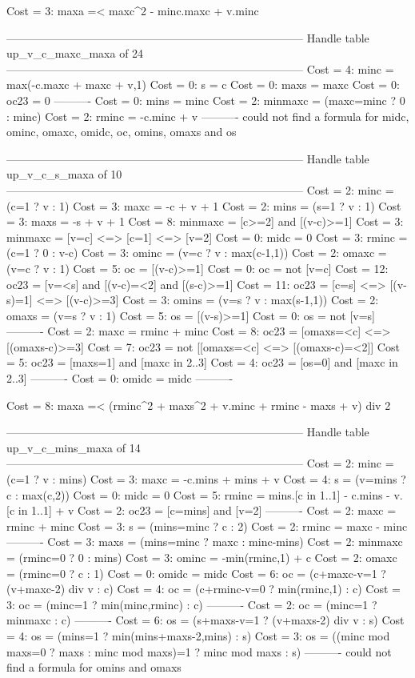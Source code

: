 Cost =  3:  maxa =< maxc^2 - minc.maxc + v.minc

--------------------------------------------------------------------------------
Handle table up_v_c_maxc_maxa of 24
--------------------------------------------------------------------------------
Cost =  4:  minc    = max(-c.maxc + maxc + v,1)
Cost =  0:  s       = c
Cost =  0:  maxs    = maxc
Cost =  0:  oc23    = 0
----------
Cost =  0:  mins    = minc
Cost =  2:  minmaxc = (maxc=minc ? 0 : minc)
Cost =  2:  rminc   = -c.minc + v
----------
could not find a formula for midc, ominc, omaxc, omidc, oc, omins, omaxs and os


--------------------------------------------------------------------------------
Handle table up_v_c_s_maxa of 10
--------------------------------------------------------------------------------
Cost =  2:  minc    = (c=1 ? v : 1)
Cost =  3:  maxc    = -c + v + 1
Cost =  2:  mins    = (s=1 ? v : 1)
Cost =  3:  maxs    = -s + v + 1
Cost =  8:  minmaxc = [c>=2] and [(v-c)>=1]
Cost =  3:  minmaxc = [v=c] <=> [c=1] <=> [v=2]
Cost =  0:  midc    = 0
Cost =  3:  rminc   = (c=1 ? 0 : v-c)
Cost =  3:  ominc   = (v=c ? v : max(c-1,1))
Cost =  2:  omaxc   = (v=c ? v : 1)
Cost =  5:  oc      = [(v-c)>=1]
Cost =  0:  oc      = not [v=c]
Cost = 12:  oc23    = [v=<s] and [(v-c)=<2] and [(s-c)>=1]
Cost = 11:  oc23    = [c=s] <=> [(v-s)=1] <=> [(v-c)>=3]
Cost =  3:  omins   = (v=s ? v : max(s-1,1))
Cost =  2:  omaxs   = (v=s ? v : 1)
Cost =  5:  os      = [(v-s)>=1]
Cost =  0:  os      = not [v=s]
----------
Cost =  2:  maxc    = rminc + minc
Cost =  8:  oc23    = [omaxs=<c] <=> [(omaxs-c)>=3]
Cost =  7:  oc23    = not [[omaxs=<c] <=> [(omaxs-c)=<2]]
Cost =  5:  oc23    = [maxs=1] and [maxc in 2..3]
Cost =  4:  oc23    = [os=0] and [maxc in 2..3]
----------
Cost =  0:  omidc   = midc
----------

Cost =  8:  maxa =< (rminc^2 + maxs^2 + v.minc + rminc - maxs + v) div 2

--------------------------------------------------------------------------------
Handle table up_v_c_mins_maxa of 14
--------------------------------------------------------------------------------
Cost =  2:  minc    = (c=1 ? v : mins)
Cost =  3:  maxc    = -c.mins + mins + v
Cost =  4:  s       = (v=mins ? c : max(c,2))
Cost =  0:  midc    = 0
Cost =  5:  rminc   = mins.[c in 1..1] - c.mins - v.[c in 1..1] + v
Cost =  2:  oc23    = [c=mins] and [v=2]
----------
Cost =  2:  maxc    = rminc + minc
Cost =  3:  s       = (mins=minc ? c : 2)
Cost =  2:  rminc   = maxc - minc
----------
Cost =  3:  maxs    = (mins=minc ? maxc : minc-mins)
Cost =  2:  minmaxc = (rminc=0 ? 0 : mins)
Cost =  3:  ominc   = -min(rminc,1) + c
Cost =  2:  omaxc   = (rminc=0 ? c : 1)
Cost =  0:  omidc   = midc
Cost =  6:  oc      = (c+maxc-v=1 ? (v+maxc-2) div v : c)
Cost =  4:  oc      = (c+rminc-v=0 ? min(rminc,1) : c)
Cost =  3:  oc      = (minc=1 ? min(minc,rminc) : c)
----------
Cost =  2:  oc      = (minc=1 ? minmaxc : c)
----------
Cost =  6:  os      = (s+maxs-v=1 ? (v+maxs-2) div v : s)
Cost =  4:  os      = (mins=1 ? min(mins+maxs-2,mins) : s)
Cost =  3:  os      = ((minc mod maxs=0 ? maxs : minc mod maxs)=1 ? minc mod maxs : s)
----------
could not find a formula for omins and omaxs

